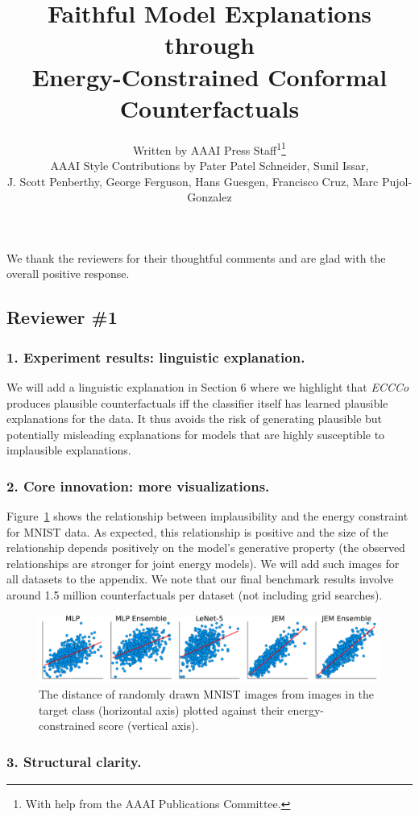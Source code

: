 \documentclass[letterpaper]{article} %
\title{Faithful Model Explanations through\\
Energy-Constrained Conformal Counterfactuals}
\author{
    Written by AAAI Press Staff\textsuperscript{\rm 1}\thanks{With help from the AAAI Publications Committee.}\\
    AAAI Style Contributions by Pater Patel Schneider,
    Sunil Issar,\\
    J. Scott Penberthy,
    George Ferguson,
    Hans Guesgen,
    Francisco Cruz\equalcontrib,
    Marc Pujol-Gonzalez\equalcontrib
}
\begin{document}
We thank the reviewers for their thoughtful comments and are glad with the overall positive response. 

\subsection*{Reviewer \#1}

\subsubsection{1. Experiment results: linguistic explanation.}  

We will add a linguistic explanation in Section 6 where we highlight that \textit{ECCCo} produces plausible counterfactuals iff the classifier itself has learned plausible explanations for the data. It thus avoids the risk of generating plausible but potentially misleading explanations for models that are highly susceptible to implausible explanations.

\subsubsection{2. Core innovation: more visualizations.} 

Figure~\ref{fig:poc} shows the relationship between implausibility and the energy constraint for MNIST data. As expected, this relationship is positive and the size of the relationship depends positively on the model's generative property (the observed relationships are stronger for joint energy models). We will add such images for all datasets to the appendix.  We note that our final benchmark results involve around 1.5 million counterfactuals per dataset (not including grid searches).

\begin{figure}[h]
    \centering
    \includegraphics[width=\linewidth]{../../www/dist_energy.png}
    \caption{The distance of randomly drawn MNIST images from images in the target class (horizontal axis) plotted against their energy-constrained score (vertical axis).}\label{fig:poc}
\end{figure}  

\subsubsection{3. Structural clarity.} 
\end{document}
